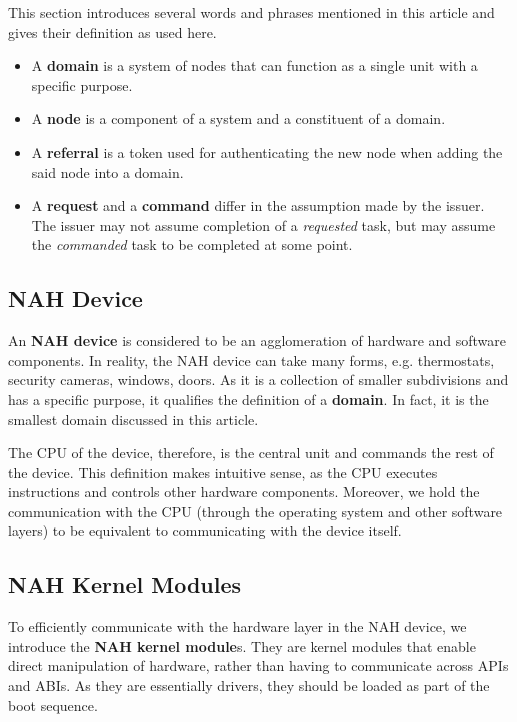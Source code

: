 \documentclass[letterpaper, twocolumn, 10pt, conference]{IEEEtran}
\newcommand{\term}[1]{\textbf{#1}}
\begin{document}
This section introduces several words and phrases mentioned in this article and gives their definition as used here.
\begin{itemize}
	\setlength\itemsep{0pt}
	\item A \term{domain} is a system of nodes that can function as a single unit with a specific purpose.
	\item A \term{node} is a component of a system and a constituent of a domain.
	\item A \term{referral} is a token used for authenticating the new node when adding the said node into a domain.
	\item A \term{request} and a \term{command} differ in the assumption made by the issuer. The issuer may not assume completion of a \emph{requested} task, but may assume the \emph{commanded} task to be completed at some point.
\end{itemize}

\subsection*{NAH Device}

An \term{NAH device} is considered to be an agglomeration of hardware and software components. In reality, the NAH device can take many forms, e.g. thermostats, security cameras, windows, doors. As it is a collection of smaller subdivisions and has a specific purpose, it qualifies the definition of a \term{domain}. In fact, it is the smallest domain discussed in this article. 

The CPU of the device, therefore, is the central unit and commands the rest of the device. This definition makes intuitive sense, as the CPU executes instructions and controls other hardware components. Moreover, we hold the communication with the CPU (through the operating system and other software layers) to be equivalent to communicating with the device itself.

\subsection*{NAH Kernel Modules}

To efficiently communicate with the hardware layer in the NAH device, we introduce the \term{NAH kernel module}s. They are kernel modules that enable direct manipulation of hardware, rather than having to communicate across APIs and ABIs. As they are essentially drivers, they should be loaded as part of the boot sequence.
\end{document}
